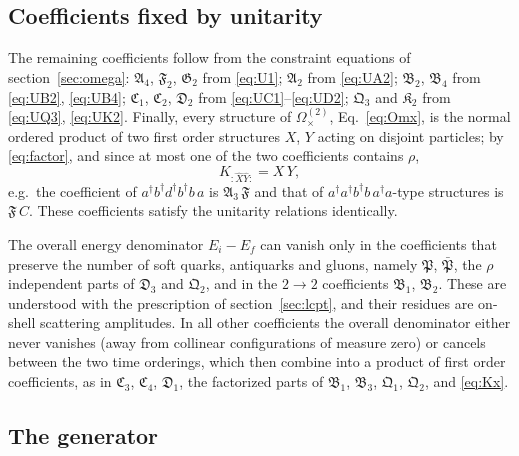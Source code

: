 \documentclass[11pt,a4paper]{article}
\numberwithin{equation}{section}
\newcommand{\mf}[1]{\mathfrak{#1}}
\newcommand{\dg}{\dagger}
\newcommand{\OM}{\Omega}
\begin{document}
\subsection{Coefficients fixed by unitarity}

The remaining coefficients follow from the constraint equations of section~\ref{sec:omega}:
$\mf A_{4}$, $\mf F_{2}$, $\mf G_{2}$ from \eqref{eq:U1}; $\mf A_{2}$ from \eqref{eq:UA2}; $\mf B_{2}$, $\mf B_{4}$
from \eqref{eq:UB2}, \eqref{eq:UB4}; $\mf C_{1}$, $\mf C_{2}$, $\mf D_{2}$ from \eqref{eq:UC1}--\eqref{eq:UD2};
$\mf Q_{3}$ and $\mf K_{2}$ from \eqref{eq:UQ3}, \eqref{eq:UK2}. Finally, every structure of
$\OM^{(2)}_{\times}$, Eq.~\eqref{eq:Omx}, is the normal ordered product of two first order structures
$X$, $Y$ acting on disjoint particles; by \eqref{eq:factor}, and since at most one of the two
coefficients contains $\rho$,
\begin{equation}
K_{:\hat X\hat Y:}=X\,Y,
\label{eq:Kx}
\end{equation}
e.g.\ the coefficient of $a^{\dg}b^{\dg}d^{\dg}b^{\dg}b\,a$ is $\mf A_{3}\,\mf F$ and that of
$a^{\dg}a^{\dg}b^{\dg}b\,a^{\dg}a$-type structures is $\mf F\,C$. These coefficients satisfy the unitarity
relations identically.

The overall energy denominator $E_{i}-E_{f}$ can vanish only in the coefficients that preserve
the number of soft quarks, antiquarks and gluons, namely $\mf P$, $\bar{\mf P}$, the $\rho$ independent
parts of $\mf D_{3}$ and $\mf Q_{2}$, and in the $2\to2$ coefficients $\mf B_{1}$, $\mf B_{2}$. These are
understood with the prescription of section~\ref{sec:lcpt}, and their residues are on-shell
scattering amplitudes. In all other coefficients the overall denominator either never vanishes
(away from collinear configurations of measure zero) or cancels between the two time orderings,
which then combine into a product of first order coefficients, as in $\mf C_{3}$, $\mf C_{4}$,
$\mf D_{1}$, the factorized parts of $\mf B_{1}$, $\mf B_{3}$, $\mf Q_{1}$, $\mf Q_{2}$, and \eqref{eq:Kx}.

\subsection{The generator}
\label{sec:generator}
\end{document}
